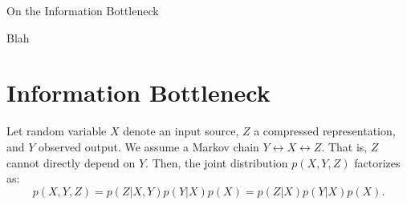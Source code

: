 \documentclass[11pt]{article}
\begin{document}
\begin{center}
{\LARGE On the Information Bottleneck} 
\end{center}

Blah

\section{Information Bottleneck}

Let random variable $X$ denote an input source, $Z$ a compressed representation, and $Y$ observed output. We assume a Markov chain $Y \leftrightarrow X \leftrightarrow Z$. That is, $Z$ cannot directly depend on $Y$. Then, the joint distribution $p(X,Y,Z)$ factorizes as:
\begin{equation}
p(X, Y, Z) = p(Z\vert X,Y)p(Y\vert X)p(X) = p(Z\vert X)p(Y\vert X)p(X).
\end{equation}




 
\end{document}
